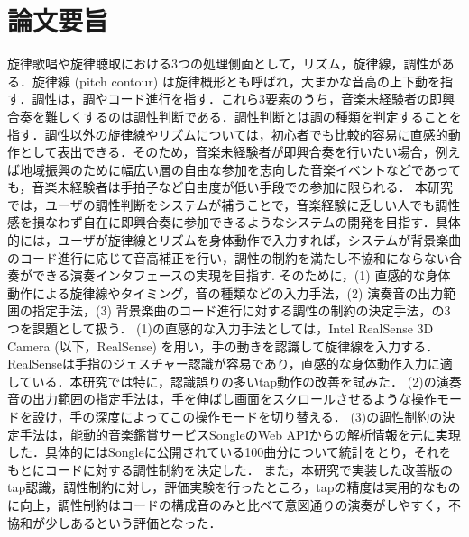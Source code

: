 \chapter*{論文要旨}
\label{chap0}
旋律歌唱や旋律聴取における3つの処理側面として，リズム，旋律線，調性がある\cite{hatano2007}．旋律線 (pitch contour) は旋律概形とも呼ばれ，大まかな音高の上下動を指す．調性は，調やコード進行を指す．これら3要素のうち，音楽未経験者の即興合奏を難しくするのは調性判断である．調性判断とは調の種類を判定することを指す．調性以外の旋律線やリズムについては，初心者でも比較的容易に直感的動作として表出できる．そのため，音楽未経験者が即興合奏を行いたい場合，例えば地域振興のために幅広い層の自由な参加を志向した音楽イベントなどであっても，音楽未経験者は手拍子など自由度が低い手段での参加に限られる．
本研究では，ユーザの調性判断をシステムが補うことで，音楽経験に乏しい人でも調性感を損なわず自在に即興合奏に参加できるようなシステムの開発を目指す．具体的には，ユーザが旋律線とリズムを身体動作で入力すれば，システムが背景楽曲のコード進行に応じて音高補正を行い，調性の制約を満たし不協和にならない合奏ができる演奏インタフェースの実現を目指す. 
そのために，(1) 直感的な身体動作による旋律線やタイミング，音の種類などの入力手法，(2) 演奏音の出力範囲の指定手法，(3) 背景楽曲のコード進行に対する調性の制約の決定手法，の3つを課題として扱う．
(1)の直感的な入力手法としては，Intel RealSense 3D Camera (以下，RealSense) を用い，手の動きを認識して旋律線を入力する．RealSenseは手指のジェスチャー認識が容易であり，直感的な身体動作入力に適している．本研究では特に，認識誤りの多いtap動作の改善を試みた．
(2)の演奏音の出力範囲の指定手法は，手を伸ばし画面をスクロールさせるような操作モードを設け，手の深度によってこの操作モードを切り替える．
(3)の調性制約の決定手法は，能動的音楽鑑賞サービスSongle\cite{songle}のWeb APIからの解析情報を元に実現した．具体的にはSongleに公開されている100曲分について統計をとり，それをもとにコードに対する調性制約を決定した．
また，本研究で実装した改善版のtap認識，調性制約に対し，評価実験を行ったところ，tapの精度は実用的なものに向上，調性制約はコードの構成音のみと比べて意図通りの演奏がしやすく，不協和が少しあるという評価となった．